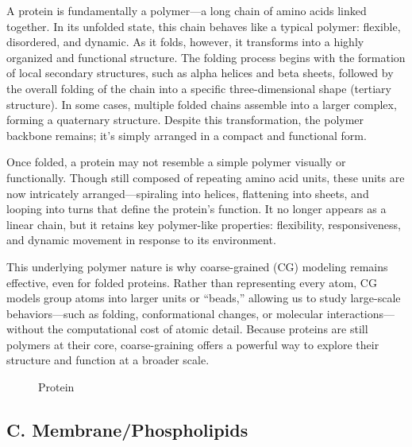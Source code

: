 \documentclass[12pt]{article}
\begin{document}
\begin{flushleft}
A protein is fundamentally a polymer—a long chain of amino acids linked together. In its unfolded state, this chain behaves like a typical polymer: flexible, disordered, and dynamic. As it folds, however, it transforms into a highly organized and functional structure. The folding process begins with the formation of local secondary structures, such as alpha helices and beta sheets, followed by the overall folding of the chain into a specific three-dimensional shape (tertiary structure). In some cases, multiple folded chains assemble into a larger complex, forming a quaternary structure. Despite this transformation, the polymer backbone remains; it’s simply arranged in a compact and functional form.

Once folded, a protein may not resemble a simple polymer visually or functionally. Though still composed of repeating amino acid units, these units are now intricately arranged—spiraling into helices, flattening into sheets, and looping into turns that define the protein's function. It no longer appears as a linear chain, but it retains key polymer-like properties: flexibility, responsiveness, and dynamic movement in response to its environment.

This underlying polymer nature is why coarse-grained (CG) modeling remains effective, even for folded proteins. Rather than representing every atom, CG models group atoms into larger units or “beads,” allowing us to study large-scale behaviors—such as folding, conformational changes, or molecular interactions—without the computational cost of atomic detail. Because proteins are still polymers at their core, coarse-graining offers a powerful way to explore their structure and function at a broader scale.


\begin{figure}[!ht]
  \centering
  
  \caption{Protein}
\end{figure}







	
	
	
	
	
\vspace{-1em} 

\subsection*{C. Membrane/Phospholipids}


\end{flushleft}
\end{document}
